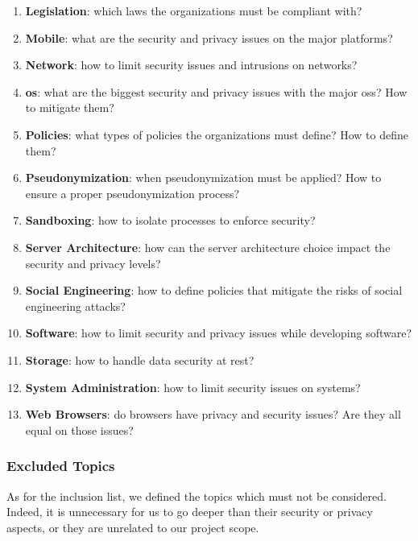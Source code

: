 \begin{enumerate}
    \item \textbf{Legislation}: which laws the organizations must be compliant with?
    \item \textbf{Mobile}: what are the security and privacy issues on the major platforms?
    \item \textbf{Network}: how to limit security issues and intrusions on networks?
    \item \textbf{\acrlong*{os}}: what are the biggest security and privacy issues with the major \glspl{os}? How to mitigate them?
    \item \textbf{Policies}: what types of policies the organizations must define? How to define them?
    \item \textbf{Pseudonymization}: when pseudonymization must be applied? How to ensure a proper pseudonymization process?
    \item \textbf{Sandboxing}: how to isolate processes to enforce security?
    \item \textbf{Server Architecture}: how can the server architecture choice impact the security and privacy levels?
    \item \textbf{Social Engineering}: how to define policies that mitigate the risks of social engineering attacks?
    \item \textbf{Software}: how to limit security and privacy issues while developing software?
    \item \textbf{Storage}: how to handle data security at rest?
    \item \textbf{System Administration}: how to limit security issues on systems?
    \item \textbf{Web Browsers}: do browsers have privacy and security issues? Are they all equal on those issues? 
\end{enumerate}

\subsubsection{Excluded Topics}
\label{subsubsec:state_review_topics_excluded}

As for the inclusion list, we defined the topics which must not be considered. Indeed, it is unnecessary for us to go deeper than their security or privacy aspects, or they are unrelated to our project scope.

